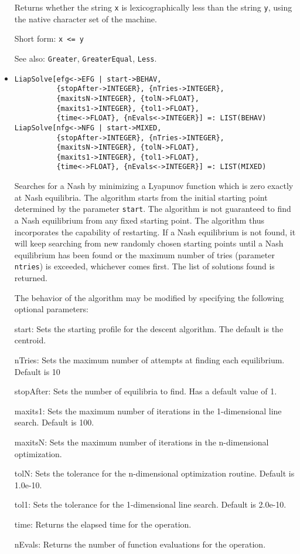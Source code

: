 \begin{itemize}
\bd
Returns whether the string \verb+x+ is lexicographically less than
the string \verb+y+, using the native character set of the machine.
\item
[Short form:] \verb+x <= y+
\item
[See also:] {\tt Greater}, {\tt GreaterEqual}, {\tt Less}.
\ed

\item
\protect \large \begin{verbatim}
LiapSolve[efg<->EFG | start->BEHAV, 
          {stopAfter->INTEGER}, {nTries->INTEGER},
          {maxitsN->INTEGER}, {tolN->FLOAT},
          {maxits1->INTEGER}, {tol1->FLOAT},
          {time<->FLOAT}, {nEvals<->INTEGER}] =: LIST(BEHAV)
LiapSolve[nfg<->NFG | start->MIXED, 
          {stopAfter->INTEGER}, {nTries->INTEGER},
          {maxitsN->INTEGER}, {tolN->FLOAT},
          {maxits1->INTEGER}, {tol1->FLOAT},
          {time<->FLOAT}, {nEvals<->INTEGER}] =: LIST(MIXED)
\end{verbatim}\normalsize


\bd
Searches for a Nash by minimizing a Lyapunov function which is zero
exactly at Nash equilibria.  The algorithm starts from the initial
starting point determined by the parameter \verb+start+.  The algorithm is
not guaranteed to find a Nash equilibrium from any fixed starting
point.  The algorithm thus incorporates the capability of restarting.
If a Nash equilibrium is not found, it will keep searching from new
randomly chosen starting points until a Nash equilibrium has been
found or the maximum number of tries (parameter \verb+ntries+) is exceeded,
whichever comes first.  The list of solutions found is returned.

The behavior of the algorithm may be modified by specifying the following
optional parameters:
\bd
\item
[start:] Sets the starting profile for the descent algorithm.  The
default is the centroid.
\item
[nTries:] Sets the maximum number of attempts at finding each
equilibrium. Default is 10
\item
[stopAfter:] Sets the number of equilibria to find.  Has a default
value of 1.  
\item
[maxits1:] Sets the maximum number of iterations in the
1-dimensional line search.  Default is 100.
\item
[maxitsN:] Sets the maximum number of iterations in the
n-dimensional optimization.  
\item
[tolN:] Sets the tolerance for the n-dimensional optimization
routine.  Default is 1.0e-10.
\item
[tol1:] Sets the tolerance for the 1-dimensional line search.
Default is 2.0e-10.
\item
[time:] Returns the elapsed time for the operation.
\item
[nEvals:] Returns the number of function evaluations for the operation.
\ed
\ed




\end{itemize}

